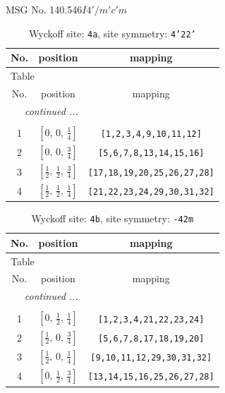 \documentclass[fleqn,8pt]{jsarticle}
\begin{document}
\setcounter{MaxMatrixCols}{32}

\renewcommand{\tablename}{Table~}
\renewcommand{\figurename}{Figure~}
\begin{center}
\LARGE
MSG No. 140.546\quad$I4'/m'c'm$
\end{center}
\renewcommand{\arraystretch}{1.2}
\begin{longtable}{ccc}
\caption{Wyckoff site: {\tt 4a}, site symmetry: {\tt 4'22'}}
 \\
 \hline \hline
No. & position & mapping \\ \hline \endfirsthead

\multicolumn{2}{l}{\tablename\ \thetable{}} \\
 \hline \hline
No. & position & mapping \\ \hline \endhead

 \hline \hline
\multicolumn{2}{r}{\footnotesize\it continued ...} \\ \endfoot

 \hline \hline
\multicolumn{2}{r}{} \\ \endlastfoot

1 & $\left[ 0,\, 0,\, \frac{1}{4} \right]$ & {\tt [1,2,3,4,9,10,11,12]} \\ \hline
2 & $\left[ 0,\, 0,\, \frac{3}{4} \right]$ & {\tt [5,6,7,8,13,14,15,16]} \\ \hline
3 & $\left[ \frac{1}{2},\, \frac{1}{2},\, \frac{3}{4} \right]$ & {\tt [17,18,19,20,25,26,27,28]} \\ \hline
4 & $\left[ \frac{1}{2},\, \frac{1}{2},\, \frac{1}{4} \right]$ & {\tt [21,22,23,24,29,30,31,32]} \\
\end{longtable}
\renewcommand{\arraystretch}{1.2}
\begin{longtable}{ccc}
\caption{Wyckoff site: {\tt 4b}, site symmetry: {\tt -42m}}
 \\
 \hline \hline
No. & position & mapping \\ \hline \endfirsthead

\multicolumn{2}{l}{\tablename\ \thetable{}} \\
 \hline \hline
No. & position & mapping \\ \hline \endhead

 \hline \hline
\multicolumn{2}{r}{\footnotesize\it continued ...} \\ \endfoot

 \hline \hline
\multicolumn{2}{r}{} \\ \endlastfoot

1 & $\left[ 0,\, \frac{1}{2},\, \frac{1}{4} \right]$ & {\tt [1,2,3,4,21,22,23,24]} \\ \hline
2 & $\left[ \frac{1}{2},\, 0,\, \frac{3}{4} \right]$ & {\tt [5,6,7,8,17,18,19,20]} \\ \hline
3 & $\left[ \frac{1}{2},\, 0,\, \frac{1}{4} \right]$ & {\tt [9,10,11,12,29,30,31,32]} \\ \hline
4 & $\left[ 0,\, \frac{1}{2},\, \frac{3}{4} \right]$ & {\tt [13,14,15,16,25,26,27,28]} \\
\end{longtable}
\end{document}

